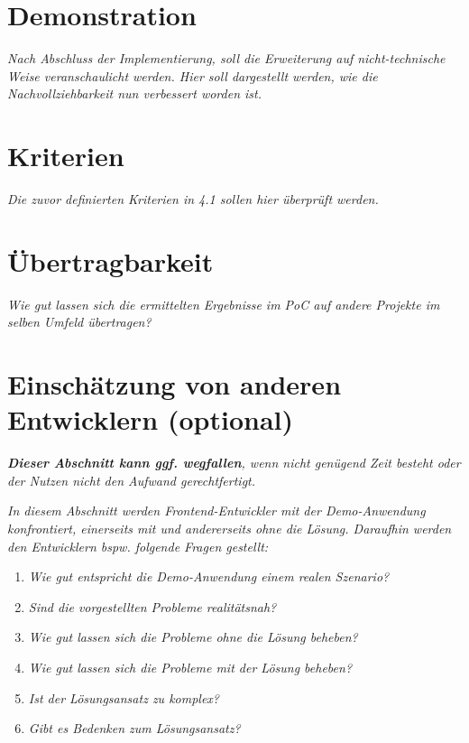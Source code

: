 
\section{Demonstration}

	\textit{Nach Abschluss der Implementierung, soll die Erweiterung auf nicht-technische Weise veranschaulicht werden. Hier soll dargestellt werden, wie die Nachvollziehbarkeit nun verbessert worden ist.}
	
\section{Kriterien}

	\textit{Die zuvor definierten Kriterien in 4.1 sollen hier überprüft werden.}
	
\section{Übertragbarkeit}

	\textit{Wie gut lassen sich die ermittelten Ergebnisse im PoC auf andere Projekte im selben Umfeld übertragen?}
	
\section{Einschätzung von anderen Entwicklern (optional)}

	\textit{\textbf{Dieser Abschnitt kann ggf. wegfallen}, wenn nicht genügend Zeit besteht oder der Nutzen nicht den Aufwand gerechtfertigt.}
	
	\textit{In diesem Abschnitt werden Frontend-Entwickler mit der Demo-Anwendung konfrontiert, einerseits mit und andererseits ohne die Lösung. Daraufhin werden den Entwicklern bspw. folgende Fragen gestellt:}
	
	\begin{enumerate}
		\item \textit{Wie gut entspricht die Demo-Anwendung einem realen Szenario?}
		\item \textit{Sind die vorgestellten Probleme realitätsnah?}
		\item \textit{Wie gut lassen sich die Probleme ohne die Lösung beheben?}
		\item \textit{Wie gut lassen sich die Probleme mit der Lösung beheben?}
		\item \textit{Ist der Lösungsansatz zu komplex?}
		\item \textit{Gibt es Bedenken zum Lösungsansatz?}
	\end{enumerate}